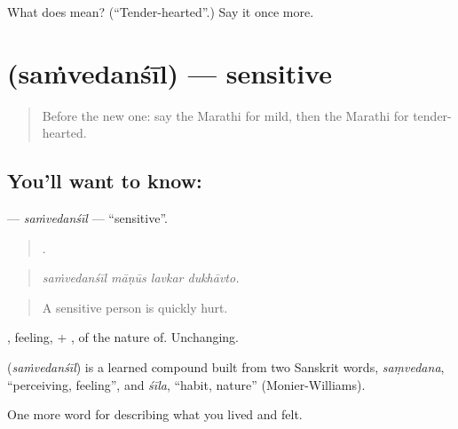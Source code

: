 \begin{tcolorbox}[breakable,colback=teal!4,colframe=teal!35!black,title={Before you move on}]
What does  mean? (\textquotedblleft{}Tender-hearted\textquotedblright{}.) Say it once more.
\end{tcolorbox}
\section[\texorpdfstring{\mr{संवेदनशील} (saṁvedanśīl)}{संवेदनशील (saṁvedanśīl)}]{ (saṁvedanśīl) — sensitive}

\label{lesson:MR-C468-samvedansil}



\begin{quote}
Before the new one: say the Marathi for mild, then the Marathi for tender-hearted.
\end{quote}

\subsection*{You'll want to know: }
\textbf{} — \emph{saṁvedanśīl} — \textquotedblleft{}sensitive\textquotedblright{}.

\begin{quote}
   .
\end{quote}

\begin{quote}
\emph{saṁvedanśīl māṇūs lavkar dukhāvto.}
\end{quote}

\begin{quote}
A sensitive person is quickly hurt.
\end{quote}

, feeling, + , of the nature of. Unchanging.

\begin{cousinweb}
\textbf{} (\emph{saṁvedanśīl}) is a learned compound built from two Sanskrit words, \emph{saṃvedana}, \textquotedblleft{}perceiving, feeling\textquotedblright{}, and \emph{śīla}, \textquotedblleft{}habit, nature\textquotedblright{} (Monier-Williams).
\end{cousinweb}

\begin{grammarlens}[title={What you've built}]
One more word for describing what you lived and felt.
\end{grammarlens}

